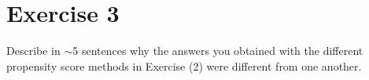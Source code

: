 
\section{Exercise 3}

\begin{quoting}
  Describe in $\sim$5 sentences why the answers you obtained with the
  different propensity score methods in Exercise (2) were different
  from one another.
\end{quoting}


